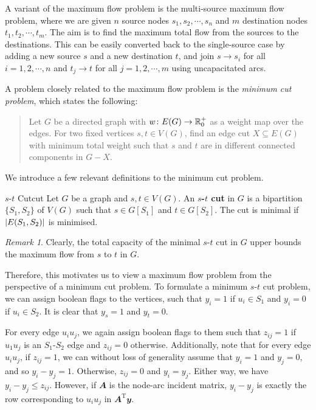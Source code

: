 \documentclass[math, code]{amznotes}
\theoremstyle{remark}
\newtheorem*{remark}{Remark}
\begin{document}
A variant of the maximum flow problem is the multi-source maximum flow problem, where we are given $n$ source nodes $s_1, s_2, \cdots, s_n$ and $m$ destination nodes $t_1, t_2, \cdots, t_m$. The aim is to find the maximum total flow from the sources to the destinations. This can be easily converted back to the single-source case by adding a new source $s$ and a new destination $t$, and join $s \to s_i$ for all $i = 1, 2, \cdots, n$ and $t_j \to t$ for all $j = 1, 2, \cdots, m$ using uncapacitated arcs. 

A problem closely related to the maximum flow problem is the \textit{minimum cut problem}, which states the following:
\begin{quote}
    Let $G$ be a directed graph with $w \colon E(G) \to \mathbb{R}^+_0$ as a weight map over the edges. For two fixed vertices $s, t \in V(G)$, find an edge cut $X \subseteq E(G)$ with minimum total weight such that $s$ and $t$ are in different connected components in $G - X$.
\end{quote}
We introduce a few relevant definitions to the minimum cut problem.
\begin{dfnbox}{$s$-$t$ Cut}{cut}
    Let $G$ be a graph and $s, t \in V(G)$. An {\color{red} \textbf{$s$-$t$ cut}} in $G$ is a bipartition $\{S_1, S_2\}$ of $V(G)$ such that $s \in G[S_1]$ and $t \in G[S_2]$. The cut is minimal if ${\left\lvert {E(S_1, S_2)} \right\rvert}$ is minimised.
\end{dfnbox}
\begin{notebox}
    \begin{remark}
        Clearly, the total capacity of the minimal $s$-$t$ cut in $G$ upper bounds the maximum flow from $s$ to $t$ in $G$.
    \end{remark}
\end{notebox}
Therefore, this motivates us to view a maximum flow problem from the perspective of a minimum cut problem. To formulate a minimum $s$-$t$ cut problem, we can assign boolean flags to the vertices, such that $y_i = 1$ if $u_i \in S_1$ and $y_i = 0$ if $u_i \in S_2$. It is clear that $y_s = 1$ and $y_t = 0$.

For every edge $u_iu_j$, we again assign boolean flags to them such that $z_{ij} = 1$ if $u_1u_j$ is an $S_1$-$S_2$ edge and $z_{ij} = 0$ otherwise. Additionally, note that for every edge $u_iu_j$, if $z_{ij} = 1$, we can without loss of generality assume that $y_i = 1$ and $y_j = 0$, and so $y_i - y_j = 1$. Otherwise, $z_{ij} = 0$ and $y_i = y_j$. Either way, we have $y_i - y_j \leq z_{ij}$. However, if $\mathbfit{A}$ is the node-arc incident matrix, $y_i - y_j$ is exactly the row corresponding to $u_iu_j$ in $\mathbfit{A}^{\mathrm{T}}\mathbfit{y}$. 
\end{document}
